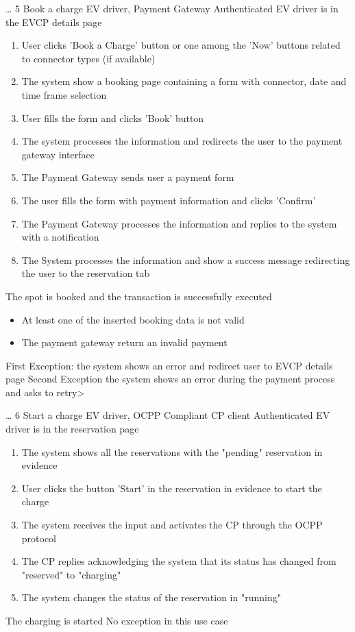 \usecase
{
    \dots %
}
{5}
{Book a charge}
{EV driver, Payment Gateway}
{Authenticated EV driver is in the EVCP details page}
{
    \begin{enumerate}
        \item User clicks 'Book a Charge' button or one among the 'Now' buttons related to connector types (if available)
        \item The system show a booking page containing a form with connector, date and time frame selection
        \item User fills the form and clicks 'Book' button
        \item The system processes the information and redirects the user to the payment gateway interface
        \item The Payment Gateway sends user a payment form
        \item The user fills the form with payment information and clicks 'Confirm'
        \item The Payment Gateway processes the information and replies to the system with a notification
        \item The System processes the information and show a success message redirecting the user to the reservation tab
    \end{enumerate}
}
{The spot is booked and the transaction is successfully executed}
{
    \begin{itemize}
        \item At least one of the inserted booking data is not valid
        \item The payment gateway return an invalid payment
    \end{itemize}
}
{
    First Exception: the system shows an error and redirect user to EVCP details page
    Second Exception the system shows an error during the payment process and asks to retry>
}

\usecase
{
    \dots %
}
{6}
{Start a charge}
{EV driver, OCPP Compliant CP client}
{Authenticated EV driver is in the reservation page}
{
    \begin{enumerate}
        \item The system shows all the reservations with the "pending" reservation in evidence
        \item User clicks the button 'Start' in the reservation in evidence to start the charge
        \item The system receives the input and activates the CP through the OCPP protocol
        \item The CP replies acknowledging the system that its status has changed from "reserved" to "charging"
        \item The system changes the status of the reservation in "running"
    \end{enumerate}
}
{The charging is started}
{
    No exception in this use case
}
{
}

